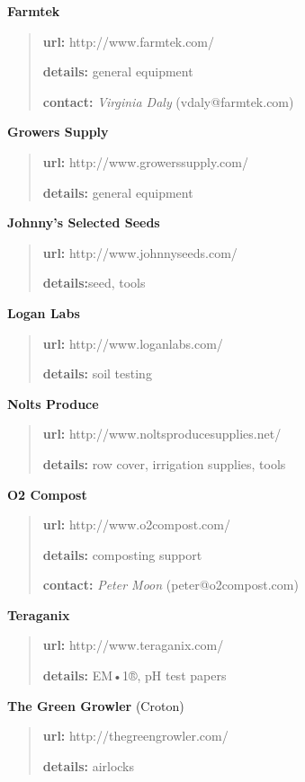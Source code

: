 \textbf{Farmtek}

\begin{quote}
\textbf{url:} http://www.farmtek.com/

\textbf{details:} general equipment

\textbf{contact:} \emph{Virginia Daly} (vdaly@farmtek.com)
\end{quote}

\textbf{Growers Supply}

\begin{quote}
\textbf{url:} http://www.growerssupply.com/

\textbf{details:} general equipment
\end{quote}

\textbf{Johnny's Selected Seeds}

\begin{quote}
\textbf{url:} http://www.johnnyseeds.com/

\textbf{details:}seed, tools
\end{quote}

\textbf{Logan Labs}

\begin{quote}
\textbf{url:} http://www.loganlabs.com/

\textbf{details:} soil testing
\end{quote}

\textbf{Nolts Produce}

\begin{quote}
\textbf{url:} http://www.noltsproducesupplies.net/

\textbf{details:} row cover, irrigation supplies, tools
\end{quote}

\textbf{O2 Compost}

\begin{quote}
\textbf{url:} http://www.o2compost.com/

\textbf{details:} composting support

\textbf{contact:} \emph{Peter Moon} (peter@o2compost.com)
\end{quote}

\textbf{Teraganix}

\begin{quote}
\textbf{url:} http://www.teraganix.com/

\textbf{details:} EM•1®, pH test papers
\end{quote}

\textbf{The Green Growler} (Croton)

\begin{quote}
\textbf{url:} http://thegreengrowler.com/

\textbf{details:} airlocks
\end{quote}

